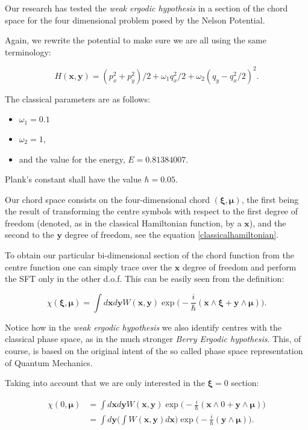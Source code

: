 \documentclass[a4paper,12pt]{article}
\newcommand{\ihb}{\frac{i}{\hbar}}
\newcommand{\xfase}{\mathbf{x}}
\newcommand{\yfase}{\mathbf{y}}
\newcommand{\xifase}{ {\boldsymbol{\xi}} }
\newcommand{\mufase}{ {\boldsymbol{\mu}} }
\begin{document}
Our research has tested the \emph{weak ergodic hypothesis} in 
a section of the chord space for the four dimensional problem
posed by the Nelson Potential.

Again, we rewrite the potential to make sure we are all
using the same terminology:


\begin{equation}\label{classicalhamiltonian}
H(\xfase,\yfase)=(p_x^2+p_y^2)/2+\omega_1 q_x^2/2+
\omega_2(q_y-q_x^2/2)^2.
\end{equation}

The classical parameters are as follows:
\begin{itemize}
\item  $\omega_1=0.1$ 
\item $\omega_2=1$,
\item and the value for the energy, $E=0.81384007$.
\end{itemize}

Plank's constant shall have the value  $\hbar=0.05$.

Our chord space consists on the four-dimensional chord
$(\xifase, \mufase)$, the first being the result of
transforming the centre symbols with respect to the
first degree of freedom (denoted, as in the classical
Hamiltonian function, by a $\xfase$), and the second
to the $\yfase$ degree of freedom, see the equation
\ref{classicalhamiltonian}.

To obtain our particular bi-dimensional section of the 
chord function from the centre function one can simply
trace over the $\xfase$ degree of freedom and 
perform the SFT only in the other d.o.f. This can be easily
seen from the definition:

\begin{equation}
\chi(\xifase,\mufase)=\int d\xfase d\yfase
W(\xfase, \yfase)\exp \big(-\ihb (\xfase\wedge \xifase+\yfase\wedge\mufase) \big).
\end{equation}

Notice how in the \emph{weak ergodic hypothesis} we also
identify centres with the classical phase space, as 
in the much stronger \emph{Berry Ergodic hypothesis}. This,
of course, is based on the original intent of the
so called phase space representation of Quantum Mechanics.

Taking into account that we are only interested
in the $\xifase=0$ section:

\begin{align}
\chi(0,\mufase) & = \int d\xfase d\yfase
W(\xfase,\yfase )
\exp \big(-\ihb (\xfase\wedge 0+\yfase\wedge\mufase) \big) \\
 & =  \int d \yfase \Biggl( \int W(\xfase, \yfase) d \xfase \Biggr) 
\exp  \bigl(-\ihb (\yfase\wedge\mufase) \bigr).
\end{align}
\end{document}
